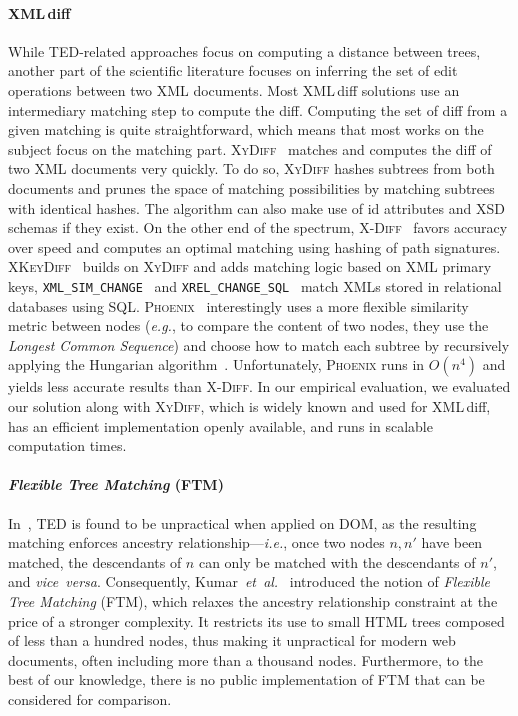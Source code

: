\paragraph{\bf XML\,diff}\label{sftm:sec:xmldiff}
While TED-related approaches focus on computing a distance between trees, another part of the scientific literature focuses on inferring the set of edit operations between two XML documents.
Most XML\,diff solutions use an intermediary matching step to compute the diff.
Computing the set of diff from a given matching is quite straightforward, which means that most works on the subject focus on the matching part.
\textsc{XyDiff}~\cite{Cobena2002DetectingDocuments} matches and computes the diff of two XML documents very quickly.
To do so, \textsc{XyDiff} hashes subtrees from both documents and prunes the space of matching possibilities by matching subtrees with identical hashes.
The algorithm can also make use of id attributes and XSD schemas if they exist.
On the other end of the spectrum, \textsc{X-Diff}~\cite{wang2003x} favors accuracy over speed and computes an optimal matching using hashing of path signatures.
\textsc{XKeyDiff}~\cite{dos2007semantical} builds on \textsc{XyDiff} and adds matching logic based on XML primary keys, \texttt{XML\_SIM\_CHANGE}~\cite{viyanon2010xml} and \texttt{XREL\_CHANGE\_SQL}~\cite{sundaram2012change} match XMLs stored in relational databases using SQL. 
\textsc{Phoenix}~\cite{oliveira2018efficient} interestingly uses a more flexible similarity metric between nodes (\emph{e.g.}, to compare the content of two nodes, they use the \emph{Longest Common Sequence}) and choose how to match each subtree by recursively applying the Hungarian algorithm~\cite{kuhn1955hungarian}.
Unfortunately, \textsc{Phoenix} runs in $O(n^4)$ and yields less accurate results than \textsc{X-Diff}.
In our empirical evaluation, we evaluated our solution along with \textsc{XyDiff}, which is widely known and used for XML\,diff, has an efficient implementation openly available, and runs in scalable computation times.

\paragraph{\bf \emph{Flexible Tree Matching} (FTM)}
In~\cite{Kumar2011_Bricolage}, TED is found to be unpractical when applied on DOM, as the resulting matching enforces ancestry relationship---\emph{i.e.}, once two nodes $n, n'$ have been matched, the descendants of $n$ can only be matched with the descendants of $n'$, and \emph{vice~versa}. 
Consequently, Kumar~\emph{et~al.}~\cite{Kumar2011_Bricolage, Kumar2011_FTM} introduced the notion of \textit{Flexible Tree Matching} (FTM), which relaxes the ancestry relationship constraint at the price of a stronger complexity.
It restricts its use to small HTML trees composed of less than a hundred nodes, thus making it unpractical for modern web documents, often including more than a thousand nodes.
Furthermore, to the best of our knowledge, there is no public implementation of FTM that can be considered for comparison.

